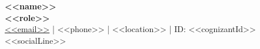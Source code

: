 \documentclass[10pt,a4paper]{article}
\begin{document}
\begin{tcolorbox}[hero]
    \begin{minipage}[c]{0.80\linewidth}
        {\fontsize{28pt}{32pt}\selectfont\bfseries <<name>>} \\[2pt]
        {\fontsize{12pt}{14pt}\selectfont\bfseries\color{accent}\uppercase <<role>>} \\[8pt]
        {\fontsize{8.5pt}{10pt}\selectfont\color{gray!60}
          \faEnvelope \hspace{2pt} \href{mailto:<<email>>}{<<email>>} \quad | \quad 
          \faPhone \hspace{2pt} <<phone>> \quad | \quad 
          \faMapMarker* \hspace{2pt} <<location>> \quad | \quad 
          \faIdBadge \hspace{2pt} ID: <<cognizantId>> <<socialLine>>
        }
    \end{minipage}%
    \begin{minipage}[c]{0.20\linewidth}
        \flushright
    \end{minipage}
\end{tcolorbox}

\vspace{10pt}
\end{document}
